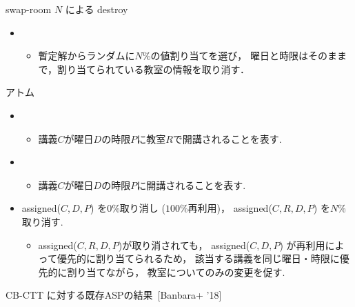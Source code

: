 \documentclass[11pt,dvipdfmx,handout]{beamer}
\begin{document}
\begin{frame}{swap-room $N$ による destroy}
 \begin{block}{}
 \begin{itemize}
  \item {}
   \begin{itemize}
    \item 暫定解からランダムに$N$\%の値割り当てを選び，
    曜日と時限はそのままで，割り当てられている教室の情報を取り消す．
   \end{itemize}
  \end{itemize}
 \end{block}
 \begin{exampleblock}{アトム}
  \begin{itemize}
   \item {}
   \begin{itemize}
    \item 講義$C$が曜日$D$の時限$P$に教室$R$で開講されることを表す.
   \end{itemize}
   \item {}
   \begin{itemize}
    \item 講義$C$が曜日$D$の時限$P$に開講されることを表す.
   \end{itemize}
  \end{itemize}
 \end{exampleblock}
 \begin{itemize}
  \item assigned($C,D,P$) を$0$\%取り消し ($100$\%再利用)，
  assigned($C,R,D,P$) を$N$\%取り消す.
  \begin{itemize}
   \item assigned($C,R,D,P$)が取り消されても，
   assigned($C,D,P$) が再利用によって優先的に割り当てられるため，
   該当する講義を同じ曜日・時限に優先的に割り当てながら，
   教室についてのみの変更を促す.
  \end{itemize}
 \end{itemize}
\end{frame}
\begin{frame}{CB-CTT に対する既存ASPの結果~[Banbara+ '18]}
  \centering
  \scriptsize
  \begin{tableC}
    
  \end{tableC}
\end{frame}
\end{document}
